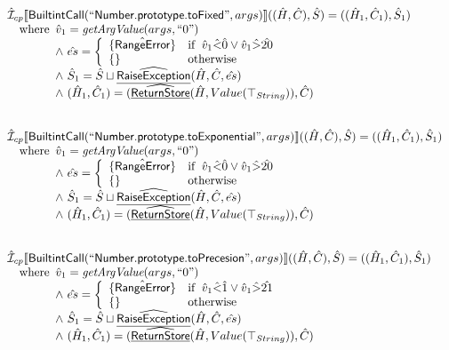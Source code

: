 \[\begin{array}{l}
\hat{\mathcal{I}} _{cp}\llbracket \mbox{\textsf{BuiltintCall}}(``\mbox{\textsf{Number.prototype.toFixed}}",args)\rrbracket((\hat{H},\hat{C}), \hat{S})
  = ((\hat{H}_1, \hat{C}_1), \hat{S}_1)\\
\quad{\rm where}\begin{array}[t]{l}
  \hat{v}_1 = \emph{getArgValue}(args, ``0")\\
  \land\ \hat{es} = \left\{\begin{array}{ll}
      \{\hat{\mbox{\textsf{RangeError}}}\} 
      & {\rm if}\begin{array}[t]{l}\hat{v}_1 \hat{<} \hat{0} \lor \hat{v}_1 \hat{>} \hat{20}\end{array}\\
      \left\{\begin{array}{l}\end{array}\right\} & {\rm otherwise}
    \end{array}\right.\\
  \land\ \hat{S}_1 = \hat{S} \sqcup \widehat{\underline{\sf RaiseException}}(\hat{H}, \hat{C}, \hat{es})\\
  \land\ (\hat{H}_1, \hat{C}_1) = (\widehat{\underline{\sf ReturnStore}}(\hat{H}, Value(\top_{String})), \hat{C})
  \end{array}\\
\\\\


\hat{\mathcal{I}} _{cp}\llbracket \mbox{\textsf{BuiltintCall}}(``\mbox{\textsf{Number.prototype.toExponential}}",args)\rrbracket((\hat{H},\hat{C}), \hat{S})
  = ((\hat{H}_1, \hat{C}_1), \hat{S}_1)\\
\quad{\rm where}\begin{array}[t]{l}
  \hat{v}_1 = \emph{getArgValue}(args, ``0")\\
  \land\ \hat{es} = \left\{\begin{array}{ll}
      \{\hat{\mbox{\textsf{RangeError}}}\} 
      & {\rm if}\begin{array}[t]{l}\hat{v}_1 \hat{<} \hat{0} \lor \hat{v}_1 \hat{>} \hat{20}\end{array}\\
      \left\{\begin{array}{l}\end{array}\right\} & {\rm otherwise}
    \end{array}\right.\\
  \land\ \hat{S}_1 = \hat{S} \sqcup \widehat{\underline{\sf RaiseException}}(\hat{H}, \hat{C}, \hat{es})\\
  \land\ (\hat{H}_1, \hat{C}_1) = (\widehat{\underline{\sf ReturnStore}}(\hat{H}, Value(\top_{String})), \hat{C})
  \end{array}\\
\\\\

\hat{\mathcal{I}} _{cp}\llbracket \mbox{\textsf{BuiltintCall}}(``\mbox{\textsf{Number.prototype.toPrecesion}}",args)\rrbracket((\hat{H},\hat{C}), \hat{S})
  = ((\hat{H}_1, \hat{C}_1), \hat{S}_1)\\
\quad{\rm where}\begin{array}[t]{l}
  \hat{v}_1 = \emph{getArgValue}(args, ``0")\\
  \land\ \hat{es} = \left\{\begin{array}{ll}
      \{\hat{\mbox{\textsf{RangeError}}}\} 
      & {\rm if}\begin{array}[t]{l}\hat{v}_1 \hat{<} \hat{1} \lor \hat{v}_1 \hat{>} \hat{21}\end{array}\\
      \left\{\begin{array}{l}\end{array}\right\} & {\rm otherwise}
    \end{array}\right.\\
  \land\ \hat{S}_1 = \hat{S} \sqcup \widehat{\underline{\sf RaiseException}}(\hat{H}, \hat{C}, \hat{es})\\
  \land\ (\hat{H}_1, \hat{C}_1) = (\widehat{\underline{\sf ReturnStore}}(\hat{H}, Value(\top_{String})), \hat{C})
  \end{array}\\
\end{array}
\]


